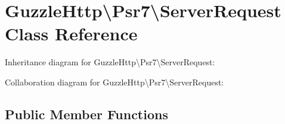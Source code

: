 \hypertarget{classGuzzleHttp_1_1Psr7_1_1ServerRequest}{}\section{Guzzle\+Http\textbackslash{}Psr7\textbackslash{}Server\+Request Class Reference}
\label{classGuzzleHttp_1_1Psr7_1_1ServerRequest}


Inheritance diagram for Guzzle\+Http\textbackslash{}Psr7\textbackslash{}Server\+Request\+:


Collaboration diagram for Guzzle\+Http\textbackslash{}Psr7\textbackslash{}Server\+Request\+:
\subsection*{Public Member Functions}
